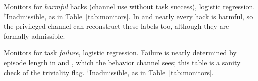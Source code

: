 \begin{table}[h]
\centering
\caption{Monitors for \emph{harmful} hacks (channel use without task success),
logistic regression. $^\dagger$Inadmissible, as in Table~\ref{tab:monitors}. In \ST{}
and \GT{} nearly every hack is harmful, so the privileged channel can reconstruct
these labels too, although they are formally admissible.}
\label{tab:monitors-harmful}
\small
\resizebox{\linewidth}{!}{}
\end{table}

\begin{table}[h]
\centering
\caption{Monitors for task \emph{failure}, logistic regression. Failure is
nearly determined by episode length in \PF{} and \ST{}, which the behavior
channel sees; this table is a sanity check of the triviality flag.
$^\dagger$Inadmissible, as in Table~\ref{tab:monitors}.}
\label{tab:monitors-failure}
\small
\resizebox{\linewidth}{!}{}
\end{table}
